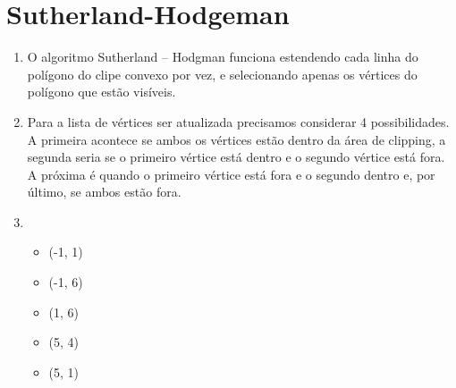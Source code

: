 \section*{Sutherland-Hodgeman}

  \begin{enumerate}[label=\arabic*)]\addtocounter{enumi}{31}
   
   		\item 
   		O algoritmo Sutherland – Hodgman funciona estendendo cada linha do polígono do clipe convexo por vez, e selecionando apenas os vértices do polígono que estão visíveis.
       \item 
 Para a lista de vértices ser atualizada precisamos considerar 4 possibilidades. A
primeira acontece se ambos os vértices estão dentro da área de  clipping, a segunda seria se o
primeiro vértice está dentro e o segundo vértice está fora. A próxima é quando o primeiro vértice
está fora e o segundo dentro e, por último, se ambos estão fora.
       \item 
       
       \begin{itemize}
       	   \item (-1, 1)
	       \item (-1, 6)
  			\item (1, 6)
			\item (5, 4)
			\item (5, 1)
       \end{itemize}

   \end{enumerate}
